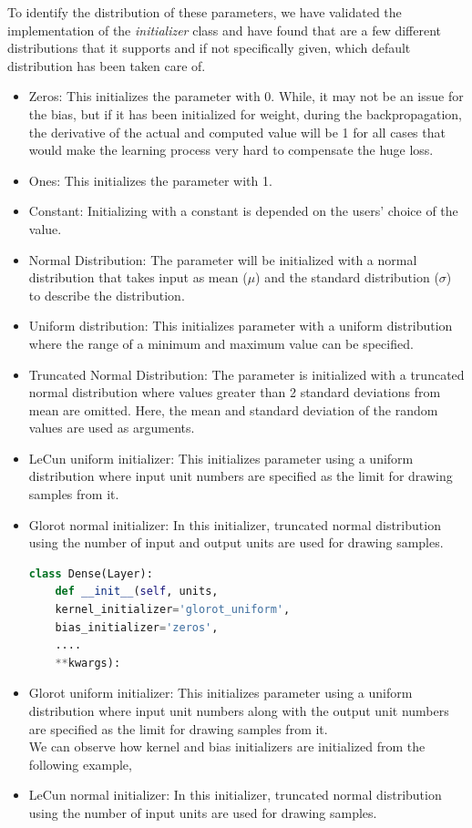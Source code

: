 To identify the distribution of these parameters, we have validated the implementation of the \emph{initializer} class and have found that are a few different distributions that it supports and if not specifically given, which default distribution has been taken care of.
\begin{itemize}
	\item Zeros: This initializes the parameter with 0. While, it may not be an issue for the bias, but if it has been initialized for weight, during the backpropagation, the derivative of the actual and computed value will be 1 for all cases that would make the learning process very hard to compensate the huge loss.
	\item Ones: This initializes the parameter with 1.
	\item Constant: Initializing with a constant is depended on the users' choice of the value.
	\item Normal Distribution: The parameter will be initialized with a normal distribution that takes input as mean ($\mu$) and the standard distribution ($\sigma$) to describe the distribution.
	\item Uniform distribution: This initializes parameter with a uniform distribution where the range of a minimum and maximum value can be specified.
	\item Truncated Normal Distribution: The parameter is initialized with a truncated normal distribution where values greater than 2 standard deviations from mean are omitted. Here, the mean and standard deviation of the random values are used as arguments.
	\item LeCun uniform initializer: This initializes parameter using a uniform distribution where input unit numbers are specified as the limit for drawing samples from it.
	\item Glorot normal initializer: In this initializer, truncated normal distribution using the number of input and output units are used for drawing samples. 
		\begin{lstlisting}[language=Python, caption=Example of Keras's default setup]
	class Dense(Layer):
	def __init__(self, units,
	kernel_initializer='glorot_uniform',
	bias_initializer='zeros',
	....
	**kwargs):\end{lstlisting}
	\item Glorot uniform initializer: This initializes parameter using a uniform distribution where input unit numbers along with the output unit numbers are specified as the limit for drawing samples from it. \\
	We can observe how kernel and bias initializers are initialized from the following example,
	\item LeCun normal initializer: In this initializer, truncated normal distribution using the number of input units are used for drawing samples.
\end{itemize}

